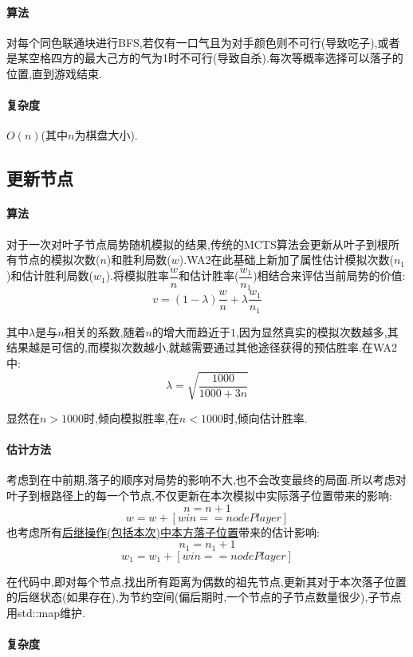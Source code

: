 \documentclass[UTF8]{article}
\newcommand{\fr}[2]{\dfrac{#1}{#2}}
\theoremstyle{definition}
\begin{document}
\paragraph{算法}
对每个同色联通块进行BFS,若仅有一口气且为对手颜色则不可行(导致吃子),或者是某空格四方的最大己方的气为1时不可行(导致自杀).每次等概率选择可以落子的位置,直到游戏结束.

\paragraph{复杂度}
$O(n)$(其中$n$为棋盘大小).

\subsection{更新节点}

\paragraph{算法}
对于一次对叶子节点局势随机模拟的结果,传统的MCTS算法会更新从叶子到根所有节点的模拟次数($n$)和胜利局数($w$).WA2在此基础上新加了属性估计模拟次数($n_1$)和估计胜利局数($w_1$).将模拟胜率$\fr{w}{n}$和估计胜率($\fr{w_1}{n_1}$)相结合来评估当前局势的价值:$$ v = (1 - \lambda) \fr{w}{n} + \lambda \fr{w_1}{n_1} $$

其中$\lambda$是与$n$相关的系数,随着$n$的增大而趋近于$1$,因为显然真实的模拟次数越多,其结果越是可信的,而模拟次数越小,就越需要通过其他途径获得的预估胜率.在WA2中:$$ \lambda = \sqrt{\fr{1000}{1000 + 3n}} $$

显然在$n > 1000$时,倾向模拟胜率,在$n < 1000$时,倾向估计胜率.

\paragraph{估计方法}

考虑到在中前期,落子的顺序对局势的影响不大,也不会改变最终的局面.所以考虑对叶子到根路径上的每一个节点,不仅更新在本次模拟中实际落子位置带来的影响:$$n = n + 1 $$$$ w = w + [win==nodePlayer]$$也考虑所有\uline{后继操作(包括本次)中本方落子位置}带来的估计影响:$$ n_1 = n_1 + 1 $$ $$w_1 = w_1 + [win==nodePlayer]$$

在代码中,即对每个节点,找出所有距离为偶数的祖先节点,更新其对于本次落子位置的后继状态(如果存在),为节约空间(偏后期时,一个节点的子节点数量很少),子节点用std::map维护.

\paragraph{复杂度}
\end{document}
